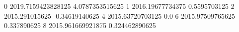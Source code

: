 0 2019.7159423828125 4.0787353515625
1 2016.19677734375 0.5595703125
2 2015.291015625 -0.34619140625
4 2015.63720703125 0.0
6 2015.97509765625 0.337890625
8 2015.961669921875 0.324462890625

